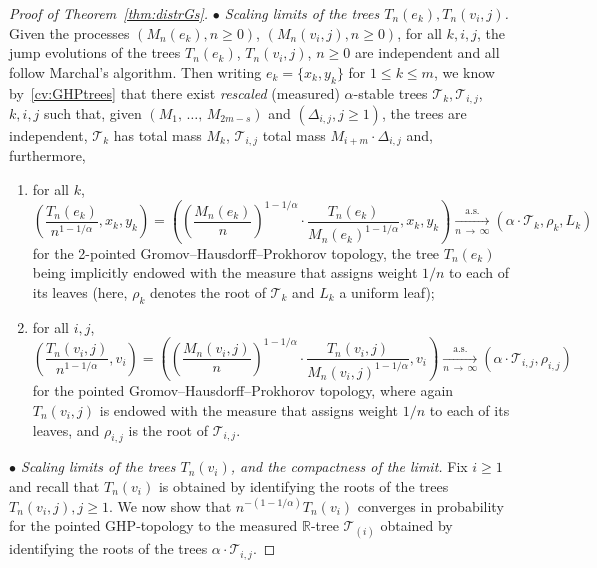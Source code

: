\documentclass[10pt]{amsart}
\theoremstyle{definition}\newtheorem{defi}[theo]{Definition}\newtheorem{rema}[theo]{Remark}\newtheorem{exam}[theo]{Example}\newtheorem{exem}[theo]{Example}\newtheorem{nota}[theo]{Notation}
\newcommand{\cT}{\mathcal{T}}
\newcommand{\R}{\mathbb{R}}
\newcommand*{\alphenumi}{\renewcommand*{\theenumi}{\alph{enumi}}}
\begin{document}
\begin{proof}[Proof of Theorem~\ref{thm:distrGs}]
\emph{$\bullet$ Scaling limits of the trees $T_n(e_k),T_{n}(v_{i},j)$.} Given the processes $(M_n(e_k),n\geq 0)$, $(M_{n}(v_{i},j), n \geq 0)$, for all $k,i,j$, the jump evolutions of the trees $T_n(e_k)$, $T_{n}(v_{i},j)$, $n \geq 0$ are independent and all follow Marchal's algorithm. Then writing $e_k=\{x_k,y_k\}$ for $1\leq k \leq m$, we know by~\eqref{cv:GHPtrees} that there exist \emph{rescaled} (measured) $\alpha$-stable trees $\cT_k,\cT_{i,j}$, $k,i,j$ such that, given $(M_1,\,\ldots,\,M_{2m-s})$ and $(\Delta_{i,j},j\geq 1)$, the trees are independent, $\cT_k$ has total mass $M_k$, $\cT_{i,j}$ total mass $M_{i+m} \cdot \Delta_{i,j}$ and, furthermore,
\begin{enumerate}\alphenumi
\item\label{prooftheo1.6.a} for all $k$,
\[
\left(\frac{T_n(e_k)}{n^{1-1/\alpha}},x_k,y_k\right)=\left(\left(\frac{M_n(e_k)}{n}\right)^{1-1/\alpha} \cdot\frac{T_n(e_k)}{M_n(e_k)^{1-1/\alpha}},x_k,y_k\right) \underset{n\,\rightarrow\, \infty}{\overset{\text{a.s.}}\longrightarrow}\left(\alpha \cdot \cT_k,\rho_k,L_k\right)
\]
for the 2-pointed Gromov--Hausdorff--Prokhorov topology, the tree $T_n(e_k)$ being implicitly endowed with the measure that assigns weight $1/n$ to each of its leaves (here, $\rho_k$ denotes the root of $\cT_k$ and $L_k$ a uniform leaf);

\item\label{prooftheo1.6.b} for all $i,j$,
\[
\left(\frac{T_{n}(v_{i},j)}{n^{1-1/\alpha}},v_i\right)=\left(\left(\frac{M_{n}\left(v_{i},j\right)}{n} \right)^{1-1/\alpha}\cdot \frac{T_{n}\left(v_{i},j\right)}{M_{n}\left(v_{i},j\right)^{1-1/\alpha}},v_i \right)\underset{n \,\rightarrow\,\infty}{\overset{\text{a.s.}}\longrightarrow} \left(\alpha \cdot \cT_{i,j},\rho_{i,j} \right)
\]
for the pointed Gromov--Hausdorff--Prokhorov topology, where again $T_{n}(v_{i},j)$ is endowed with the measure that assigns weight $1/n$ to each of its leaves, and $\rho_{i,j}$ is the root of $\cT_{i,j}$.
\end{enumerate}


\emph{$\bullet$ Scaling limits of the trees $T_n(v_{i})$, and the compactness of the limit.}
Fix $i \ge 1$ and recall that $T_n(v_{i})$ is obtained by identifying the roots of the trees $T_{n}(v_{i},j),j\geq 1$. We now show that $n^{-(1-1/\alpha)} T_n(v_i)$ converges in probability for the pointed GHP-topology to the measured $\R$-tree $\cT_{(i)}$ obtained by identifying the roots of the trees $\alpha \cdot \cT_{i,j}$.


\end{proof}
\end{document}

